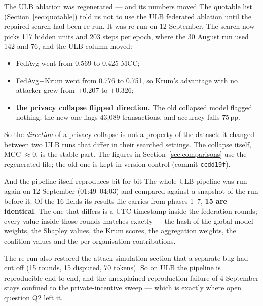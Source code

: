 \documentclass[11pt]{article}
\begin{document}
\begin{warnbox}{The ULB ablation was regenerated --- and its numbers moved}
The quotable list (Section~\ref{sec:quotable}) told us not to use the ULB federated ablation until the
repaired search had been re-run. It was re-run on 12 September. The search now picks 117 hidden units and
203 steps per epoch, where the 30 August run used 142 and 76, and the ULB column moved:
\begin{itemize}
  \item FedAvg went from 0.569 to 0.425 MCC;
  \item FedAvg+Krum went from 0.776 to 0.751, so Krum's advantage with no attacker grew from $+0.207$ to
  $+0.326$;
  \item \textbf{the privacy collapse flipped direction.} The old collapsed model flagged nothing; the new
  one flags 43{,}089 transactions, and accuracy falls 75\,pp.
\end{itemize}
So the \emph{direction} of a privacy collapse is not a property of the dataset: it changed between two ULB
runs that differ in their searched settings. The collapse itself, MCC $\approx 0$, is the stable part. The
figures in Section~\ref{sec:comparisons} use the regenerated file; the old one is kept in version control
(commit \texttt{ccdd19f}).
\end{warnbox}

\begin{keybox}{And the pipeline itself reproduces bit for bit}
The whole ULB pipeline was run again on 12 September (01:49--04:03) and compared against a snapshot of
the run before it. Of the 16 fields its results file carries from phases 1--7, \textbf{15 are identical}.
The one that differs is a UTC timestamp inside the federation rounds; every value inside those rounds
matches exactly --- the hash of the global model weights, the Shapley values, the Krum scores, the
aggregation weights, the coalition values and the per-organisation contributions.

The re-run also restored the attack-simulation section that a separate bug had cut off (15 rounds, 15
disputed, 70 tokens). So on ULB the pipeline is reproducible end to end, and the unexplained reproduction
failure of 4 September stays confined to the private-incentive sweep --- which is exactly where open
question Q2 left it.
\end{keybox}
\end{document}

